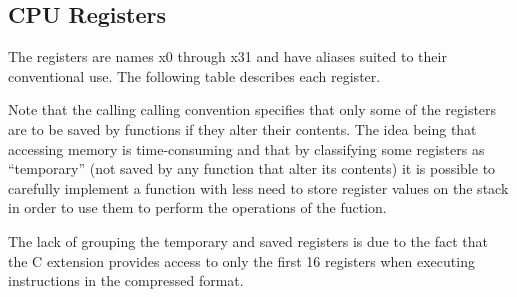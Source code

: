 \subsection{CPU Registers}
\label{cpuregs}

The registers are names x0 through x31 and have aliases suited to their 
conventional use.  The following table describes each register.  

Note 
that the calling calling convention specifies that only some 
of the registers are to be saved by functions if they alter their contents.
The idea being that accessing memory is time-consuming and that by
classifying some registers as ``temporary'' (not saved by any function
that alter its contents) it is possible to carefully implement a function
with less need to store register values on the stack in order to use them
to perform the operations of the fuction.

The lack of grouping the temporary and saved registers is due to the
fact that the C extension %
provides access to only the first 16 registers when executing instructions 
in the compressed format.  


